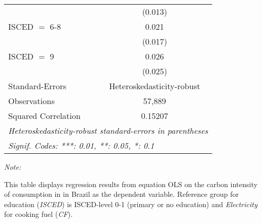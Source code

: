 \begin{table}[htbp!]
\begin{adjustbox}{width = 1\textwidth, max height = 0.95\textheight, center}
\begin{threeparttable}[b]
\begin{tabular}{lc}
                                & (0.013)\\   
            ISCED $=$ 6-8       & 0.021\\   
                                & (0.017)\\   
            ISCED $=$ 9         & 0.026\\   
                                & (0.025)\\   
            \midrule 
            Standard-Errors     & Heteroskedasticity-robust \\   
            Observations        & 57,889\\  
            Squared Correlation & 0.15207\\  
            \midrule \midrule
            \multicolumn{2}{l}{\emph{Heteroskedasticity-robust standard-errors in parentheses}}\\
            \multicolumn{2}{l}{\emph{Signif. Codes: ***: 0.01, **: 0.05, *: 0.1}}\\
         \end{tabular}
         
         \begin{tablenotes}\item \medskip \textit{Note:}
            \item This table displays regression results from equation OLS on the carbon intensity of consumption in  in Brazil as the dependent variable. Reference group for education (\textit{ISCED}) is ISCED-level 0-1 (primary or no education) and \textit{Electricity} for cooking fuel (\textit{CF}).
         \end{tablenotes}
      \end{threeparttable}
   \end{adjustbox}
\end{table}


